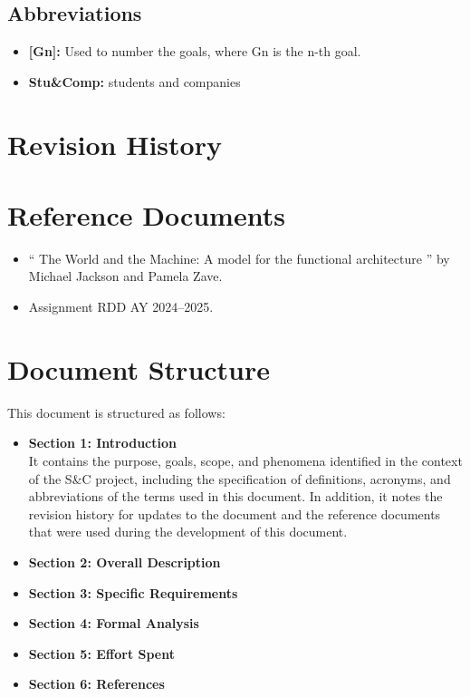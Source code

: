 \subsection{Abbreviations}\label{subsec:abbreviations}
\begin{itemize}
    \item \textbf{[Gn]:} Used to number the goals, where Gn is the n-th goal.
    \item \textbf{Stu\&Comp:} students and companies
\end{itemize}

\section{Revision History}\label{sec:revisionhistory}

\section{Reference Documents}\label{sec:reference}
\begin{itemize}
    \item `` The World and the Machine: A model for the functional architecture '' by Michael Jackson and Pamela Zave.
    \item Assignment RDD AY 2024–2025.
\end{itemize}

\section{Document Structure}\label{sec:structure}
This document is structured as follows:
\begin{itemize}
    \item \textbf{Section 1: Introduction} 
    \\It contains the purpose, goals, scope, and phenomena identified in the context of the S\&C project, 
    including the specification of definitions, acronyms, and abbreviations of the terms used in this document. In addition, it notes the revision 
    history for updates to the document and the reference documents that were used during the development of this document.
    \item \textbf{Section 2: Overall Description}
    \item \textbf{Section 3: Specific Requirements}
    \item \textbf{Section 4: Formal Analysis}
    \item \textbf{Section 5: Effort Spent}
    \item \textbf{Section 6: References}
\end{itemize}